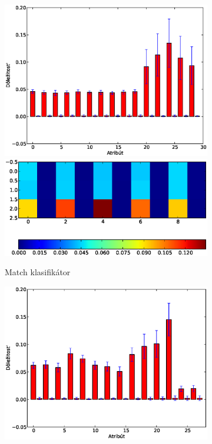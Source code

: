 \begin{figure}[htp]
        \centering
        \begin{subfigure}[t]{0.4\textwidth}
                \includegraphics[width=\textwidth]{images/clf_fi/randomforest_combined_5_bars}
                \includegraphics[width=\textwidth]{images/clf_fi/randomforest_combined_5_heatmap}
                \caption{Match klasifikátor}
                \label{fig:datatype4-m}
        \end{subfigure}%
        \qquad\qquad %
        \begin{subfigure}[t]{0.4\textwidth}
                \includegraphics[width=\textwidth]{images/clf_fi/randomforest_combined_5_indel_bars}

\end{subfigure}
\end{figure}
